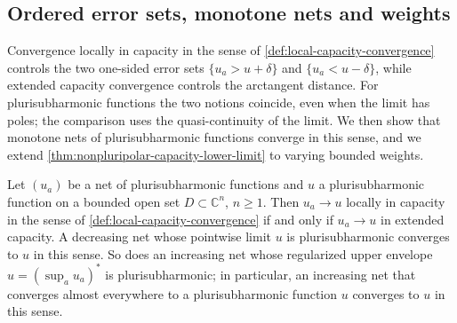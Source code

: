 \subsection{Ordered error sets, monotone nets and weights}
\label{sec:capacity-nets-weighted-limits}
Convergence locally in capacity in the sense of \cref{def:local-capacity-convergence} controls the two one-sided error sets $\{u_a>u+\delta\}$ and $\{u_a<u-\delta\}$, while extended capacity convergence controls the arctangent distance. For plurisubharmonic functions the two notions coincide, even when the limit has poles; the comparison uses the quasi-continuity of the limit. We then show that monotone nets of plurisubharmonic functions converge in this sense, and we extend \cref{thm:nonpluripolar-capacity-lower-limit} to varying bounded weights.

\begin{proposition}\label{prop:psh-capacity-topologies}
Let $(u_a)$ be a net of plurisubharmonic functions and $u$ a plurisubharmonic function on a bounded open set $D\subset\mathbb C^n$, $n\geq1$. Then $u_a\to u$ locally in capacity in the sense of \cref{def:local-capacity-convergence} if and only if $u_a\to u$ in extended capacity. A decreasing net whose pointwise limit $u$ is plurisubharmonic converges to $u$ in this sense. So does an increasing net whose regularized upper envelope $u=(\sup_au_a)^*$ is plurisubharmonic; in particular, an increasing net that converges almost everywhere to a plurisubharmonic function $u$ converges to $u$ in this sense.
\end{proposition}
